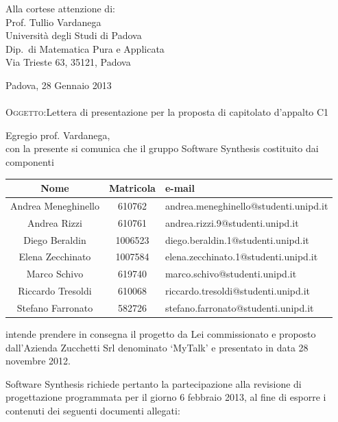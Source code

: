 \documentclass[a4paper,10pt]{letter}
\begin{document}
\begin{flushright}
\begin{minipage}[t]{.5\textwidth}
Alla cortese attenzione di:\\
Prof. Tullio Vardanega\\
Università degli Studi di Padova\\
Dip.~di Matematica Pura e Applicata\\
Via Trieste 63, 35121, Padova\\
\end{minipage}
\end{flushright}

Padova, 28 Gennaio 2013\\\\
\bigskip
\textsc{Oggetto:}Lettera di presentazione per la proposta di capitolato d’appalto C1

\noindent{}Egregio prof. Vardanega,\\
\hspace*{11em} con la presente si comunica che il gruppo Software Synthesis costituito dai componenti

\begin{center}
\begin{tabular} {c|c|l}
{\bf Nome}&{\bf Matricola}&{\bf e-mail}\\ 
\hline
Andrea Meneghinello & 610762& andrea.meneghinello@studenti.unipd.it\\
Andrea Rizzi & 610761&andrea.rizzi.9@studenti.unipd.it\\
Diego Beraldin& 1006523& diego.beraldin.1@studenti.unipd.it\\
Elena Zecchinato&1007584&elena.zecchinato.1@studenti.unipd.it\\
Marco Schivo &619740& marco.schivo@studenti.unipd.it\\
Riccardo Tresoldi &610068 &riccardo.tresoldi@studenti.unipd.it\\
Stefano Farronato &582726&stefano.farronato@studenti.unipd.it\\
\end{tabular}
\end{center}
\bigskip
intende prendere in consegna il progetto da Lei commissionato e proposto dall'Azienda Zucchetti Srl denominato `MyTalk' e presentato in data 28 novembre 2012.

Software Synthesis richiede pertanto la partecipazione alla revisione di progettazione programmata per il giorno 6 febbraio 2013, al fine di esporre i contenuti dei seguenti documenti allegati:
\end{document}

